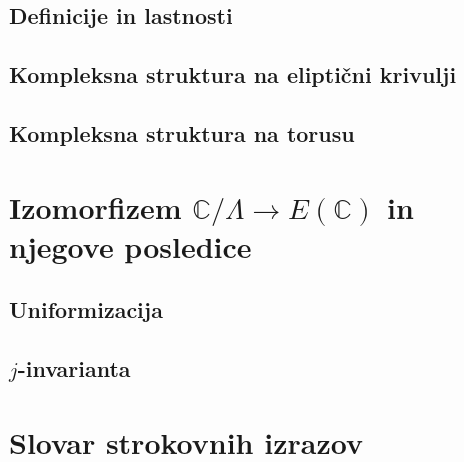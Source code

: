 \documentclass[mat1]{fmfdelo}
\newcommand{\C}{\mathbb C}
\theoremstyle{definition}
\begin{document}
\subsection{Definicije in lastnosti}
\subsection{Kompleksna struktura na eliptični krivulji}
\subsection{Kompleksna struktura na torusu}
\break




\section{Izomorfizem \texorpdfstring{$\C/\Lambda \to E(\C)$}{} in njegove posledice} \label{poglavje izomorfizem}

\subsection{Uniformizacija}
\subsection{$j$-invarianta}
 

\break

\section*{Slovar strokovnih izrazov}

\geslo{}{}
\geslo{}{}

\end{document}

